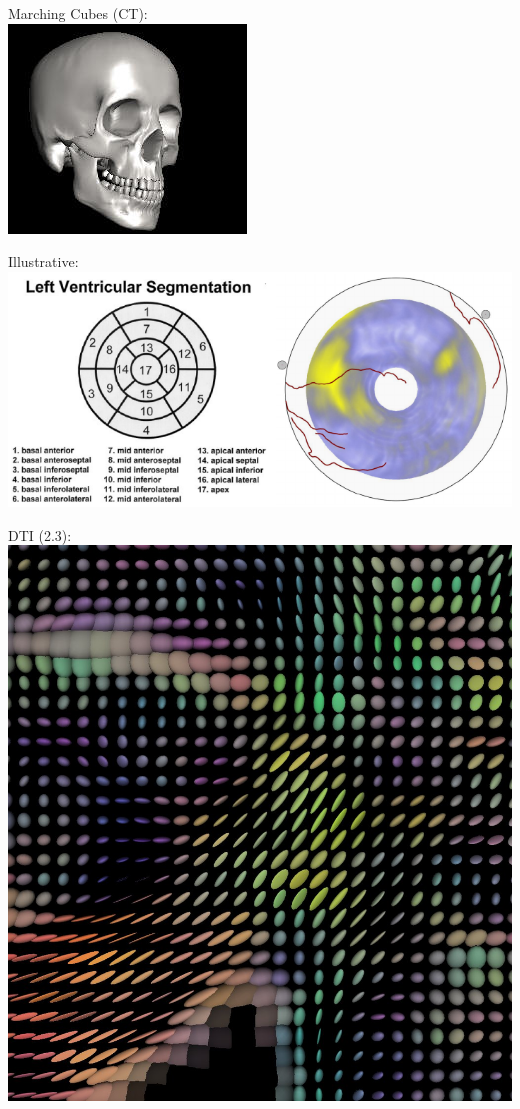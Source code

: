 \documentclass{beamer}
\begin{document}
\begin{frame}
	Marching Cubes (CT):\\
	\includegraphics[width=.4\textwidth,height=.4\textheight]{images/marching}
\end{frame}

\begin{frame}
	Illustrative:
	\includegraphics[width=\textwidth]{images/heart}
\end{frame}

\begin{frame}
	DTI (2.3):
	\includegraphics[width=\textwidth]{images/dti}
\end{frame}
\end{document}
